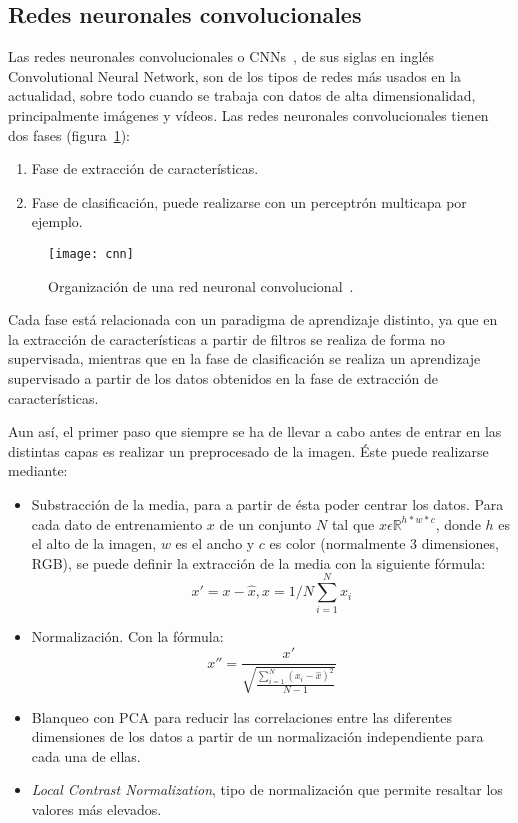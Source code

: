 \subsection{Redes neuronales convolucionales}
Las redes neuronales convolucionales o CNNs~\cite{cnn}, de sus siglas en inglés Convolutional Neural Network, son de los tipos de redes más usados en la actualidad, sobre todo cuando se trabaja con datos de alta dimensionalidad, principalmente imágenes y vídeos. Las redes neuronales convolucionales tienen dos fases (figura~\ref{fig:cnn}):
\begin{enumerate}
	\item Fase de extracción de características.
	\item Fase de clasificación, puede realizarse con un perceptrón multicapa por ejemplo.
\end{enumerate}

\begin{figure}[h]
	\centering
	\texttt{[image: cnn]}
	\caption[Organización de una red neuronal convolucional.]{Organización de una red neuronal convolucional~\cite{cnn}.}
	\label{fig:cnn}
\end{figure}

Cada fase está relacionada con un paradigma de aprendizaje distinto, ya que en la extracción de características a partir de filtros se realiza de forma no supervisada, mientras que en la fase de clasificación se realiza un aprendizaje supervisado a partir de los datos obtenidos en la fase de extracción de características.


Aun así, el primer paso que siempre se ha de llevar a cabo antes de entrar en las distintas capas es realizar un preprocesado de la imagen. Éste puede realizarse mediante:
\begin{itemize}
	\item Substracción de la media, para a partir de ésta poder centrar los datos. Para cada dato de entrenamiento $x$ de un conjunto $N$ tal que $x \epsilon \mathbb{R}^{h*w*c}$, donde $h$ es el alto de la imagen, $w$ es el ancho y $c$ es color (normalmente 3 dimensiones, RGB), se puede definir la extracción de la media con la siguiente fórmula:
	\begin{equation}
	x'=x-\widehat{x}, \widehat{x}=1/N\sum_{i=1}^{N}x_i
	\end{equation}
	\item Normalización. Con la fórmula:
	\begin{equation}
	x''=\frac{x'}{\sqrt{\frac{\sum_{i=1}^{N}(x_i-\widehat{x})^2}{N-1}}}
	\end{equation}
	\item Blanqueo con PCA para reducir las correlaciones entre las diferentes dimensiones de los datos a partir de un normalización independiente para cada una de ellas.
	\item \textit{Local Contrast Normalization}, tipo de normalización que permite resaltar los valores más elevados.
\end{itemize}

